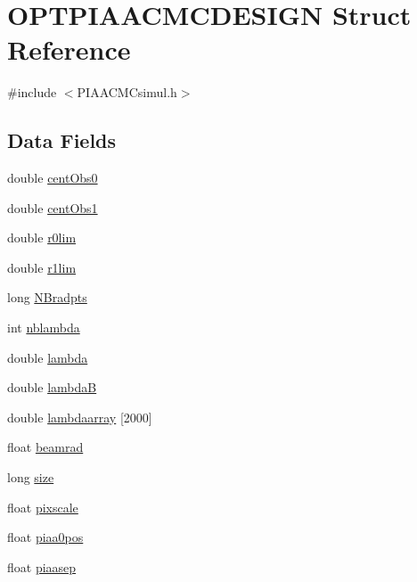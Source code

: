 \hypertarget{structOPTPIAACMCDESIGN}{\section{O\+P\+T\+P\+I\+A\+A\+C\+M\+C\+D\+E\+S\+I\+G\+N Struct Reference}
\label{structOPTPIAACMCDESIGN}
}


{\ttfamily \#include $<$P\+I\+A\+A\+C\+M\+Csimul.\+h$>$}

\subsection*{Data Fields}
\begin{DoxyCompactItemize}
\item 
double \hyperlink{structOPTPIAACMCDESIGN_ad8031116439ad3b191f5fb6e6cfe0070}{cent\+Obs0}
\item 
double \hyperlink{structOPTPIAACMCDESIGN_a4d8d03c42ff2aec6c5b974d80d086a5e}{cent\+Obs1}
\item 
double \hyperlink{structOPTPIAACMCDESIGN_a0f039998bd513a4a91d5d144ba51001c}{r0lim}
\item 
double \hyperlink{structOPTPIAACMCDESIGN_a4842ab89cd721c1c83af3d4b728ffcf6}{r1lim}
\item 
long \hyperlink{structOPTPIAACMCDESIGN_a8389b7bc4b26b28b6b95eed878237000}{N\+Bradpts}
\item 
int \hyperlink{structOPTPIAACMCDESIGN_a02144a94930448a77754dee947a8600e}{nblambda}
\item 
double \hyperlink{structOPTPIAACMCDESIGN_a64a6567f44c2102f913d378930c2c5f7}{lambda}
\item 
double \hyperlink{structOPTPIAACMCDESIGN_ac4a10cbfc3935db33fb2f3c5612fe0ef}{lambda\+B}
\item 
double \hyperlink{structOPTPIAACMCDESIGN_ab2531941300d605b9ecc3263dcfafb7b}{lambdaarray} \mbox{[}2000\mbox{]}
\item 
float \hyperlink{structOPTPIAACMCDESIGN_ac90bf363beaa0d44651ae1c69268de15}{beamrad}
\item 
long \hyperlink{structOPTPIAACMCDESIGN_a9a77cc42ff9de1dbd1d484e7020da6eb}{size}
\item 
float \hyperlink{structOPTPIAACMCDESIGN_a41ee229fbf9d612f8650c127b7ed022b}{pixscale}
\item 
float \hyperlink{structOPTPIAACMCDESIGN_a3b878597ef430b432a169fbd1138112a}{piaa0pos}
\item 
float \hyperlink{structOPTPIAACMCDESIGN_ab9b00e2fc69b7a0b11354d5cdf718635}{piaasep}

\end{DoxyCompactItemize}
